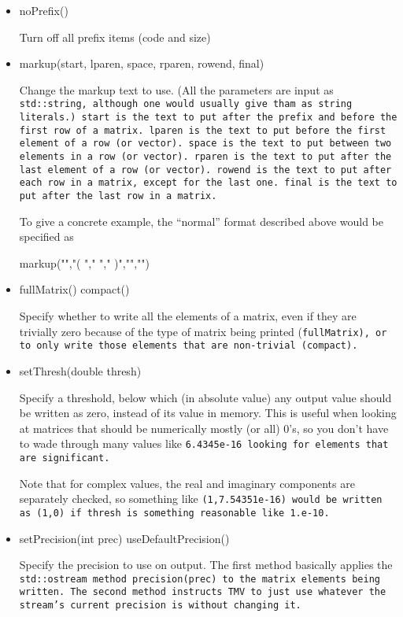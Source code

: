 \begin{itemize}
\item
\begin{tmvcode}
noPrefix()
\end{tmvcode}
Turn off all prefix items (code and size)

\item
\begin{tmvcode}
markup(start, lparen, space, rparen, rowend, final)
\end{tmvcode}
Change the markup text to use.  (All the parameters are input as \tt{std::string}, although one would usually give tham as string literals.)  \tt{start} is the text to put after the prefix and before the first row of a matrix.  \tt{lparen} is the text to put before the first element of a row (or vector).  \tt{space} is the text to put between two elements in a row (or vector).  \tt{rparen} is the text to put after the last element of a row (or vector).  \tt{rowend} is the text to put after each row in a matrix, except for the last one.  \tt{final} is the text to put after the last row in a matrix.

To give a concrete example, the ``normal'' format described above would be specified as
\begin{tmvcode}
markup("\n","( ","  "," )","\n","\n")
\end{tmvcode}

\item
\begin{tmvcode}
fullMatrix()
compact()
\end{tmvcode}
Specify whether to write all the elements of a matrix, even if they are trivially zero because of the type of matrix being printed (\tt{fullMatrix}), or to only write those elements that are non-trivial (\tt{compact}).

\item
\begin{tmvcode}
setThresh(double thresh)
\end{tmvcode}
Specify a threshold, below which (in absolute value) any output value should be written as zero, instead of its value in memory.  This is useful when looking at matrices that should be numerically mostly (or all) 0's, so you don't have to wade through many values like \tt{6.4345e-16} looking for elements that are significant.

Note that for complex values, the real and imaginary components are separately checked, so something like \tt{(1,7.54351e-16)} would be written as \tt{(1,0)} if \tt{thresh} is something reasonable like \tt{1.e-10}.

\item
\begin{tmvcode}
setPrecision(int prec)
useDefaultPrecision()
\end{tmvcode}
Specify the precision to use on output.  The first method basically applies the \tt{std::ostream} method \tt{precision(prec)} to the matrix elements being written.  The second method instructs TMV to just use whatever the stream's current precision is without changing it.

\end{itemize}

